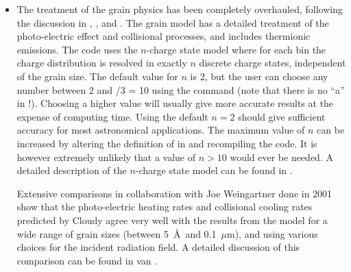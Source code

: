 \begin{itemize}
{    convergence of the emitted spectrum.} and single-sized grains (including
  PAH's, but excluding grey grains for which quantum heating is never used).
  The user can change the default behavior of the code by including the
  keyword  (to enable quantum heating) or  (to disable quantum heating) with the  command.
  If the relative grain abundance $A_{\rm rel}(r)$ in a particular zone
  (variable ) drops below a preset
  threshold value (variable , default value
  $10^{-5}$), quantum heating will be disabled for that zone only. Note that
  quantum heating usually only influences the energy distribution of the
  emitted spectrum, nothing else\footnote{Quantum heating can influence the
    emission line spectrum as well if continuum pumping of the lines by the
    short wavelength end of the dust spectrum is important. Typically these
    will be molecular lines.}. So switching off quantum heating can be a good
  idea to speed up the modeling, provided the correct shape of the emitted
  spectrum has no influence on the results the user is interested in.
\item The treatment of the grain physics has been completely overhauled,
  following the discussion in \citet{Weingartner2001a}, \citet{VanHoof2004},
  and \citet{Weingartner2006}. The grain model has a detailed treatment of the
  photo-electric effect and collisional processes, and includes thermionic
  emissions. The code uses the $n$-charge state model where for each bin the
  charge distribution is resolved in exactly $n$ discrete charge states,
  independent of the grain size. The default value for $n$ is 2, but the user
  can choose any number between 2 and /3 = 10 using the
   command (note that there is no ``a'' in
  !). Choosing a higher value will usually give more accurate
  results at the expense of computing time. Using the default $n = 2$ should
  give sufficient accuracy for most astronomical applications. The maximum
  value of $n$ can be increased by altering the definition of
   in  and recompiling the code. It is
  however extremely unlikely that a value of $n > 10$ would ever be needed. A
  detailed description of the $n$-charge state model can be found in
  \citet{VanHoof2004}.

  Extensive comparisons in collaboration with Joe Weingartner done in 2001
  show that the photo-electric heating rates and collisional cooling rates
  predicted by Cloudy agree very well with the results from the
  \citet{Weingartner2001a} model for a wide range of grain sizes (between
  5~\AA\ and 0.1~$\mu$m), and using various choices for the incident radiation
  field. A detailed discussion of this comparison can be found in van
  \citet{VanHoof2001}.
\end{itemize}

